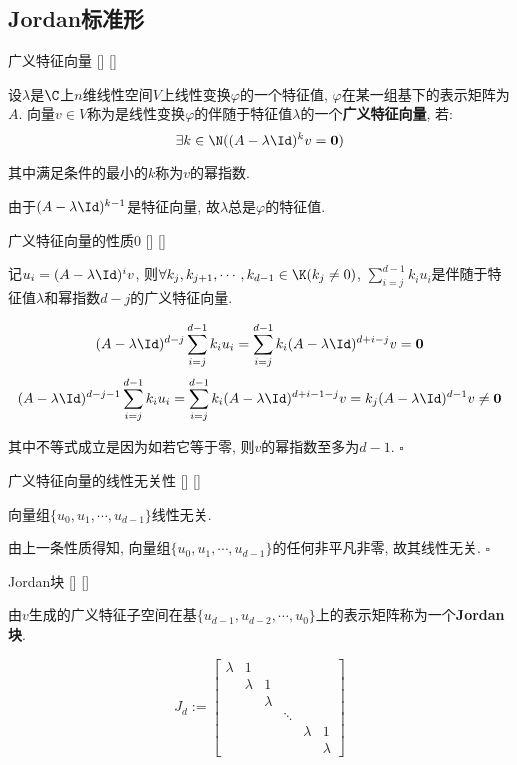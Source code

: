 \documentclass[UTF8]{ctexart}
\begin{document}
	\subsection{Jordan标准形}
	
		\begin{dfn}
			[]
			{广义特征向量}
			[]
			[]

			设$\lambda$是$\C$上$n$维线性空间$V$上线性变换$\varphi$的一个特征值, $\varphi$在某一组基下的表示矩阵为$A$. 向量$v\in V$称为是线性变换$\varphi$的伴随于特征值$\lambda$的一个\textbf{广义特征向量}, 若: 
			\[\exists k\in\N((A-\lambda\Id)^k v=\mathbf{0})\]

			其中满足条件的最小的$k$称为$v$的幂指数. 

			由于$(A-\lambda\Id)^{k-1}$是特征向量, 故$\lambda$总是$\varphi$的特征值. 
		\end{dfn}
		
		\begin{ppt}
			[]
			{广义特征向量的性质0}
			[]
			[]

			记$u_i=(A-\lambda\Id)^i v$, 则$\forall k_j,k_{j+1},\cdots,k_{d-1}\in\K(k_j\neq 0)$, $\sum\limits_{i=j}^{d-1}k_i u_i$是伴随于特征值$\lambda$和幂指数$d-j$的广义特征向量. 
		\end{ppt}

		\begin{prf} 
			\[(A-\lambda\Id)^{d-j}\sum_{i=j}^{d-1}k_i u_i=\sum_{i=j}^{d-1}k_i (A-\lambda\Id)^{d+i-j} v=\mathbf{0}\]
			\[(A-\lambda\Id)^{d-j-1}\sum_{i=j}^{d-1}k_i u_i=\sum_{i=j}^{d-1}k_i (A-\lambda\Id)^{d+i-1-j} v=k_j(A-\lambda\Id)^{d-1} v\neq\mathbf{0}\]

			其中不等式成立是因为如若它等于零, 则$v$的幂指数至多为$d-1$. $\square$
		\end{prf}
		\begin{ppt}
			[]
			{广义特征向量的线性无关性}
			[]
			[]

			向量组$\{u_0,u_1,\cdots,u_{d-1}\}$线性无关. 
		\end{ppt}

		\begin{prf} 
		
			由上一条性质得知, 向量组$\{u_0,u_1,\cdots,u_{d-1}\}$的任何非平凡 非零, 故其线性无关. $\square$
		\end{prf}
		\begin{dfn}
			[]
			{Jordan块}
			[]
			[]

			由$v$生成的广义特征子空间在基$\{u_{d-1},u_{d-2},\cdots,u_0\}$上的表示矩阵称为一个\textbf{Jordan块}. 
		
			\[J_d:=
			\begin{bmatrix}
				\lambda & 1\\
				 & \lambda & 1\\
				 & & \lambda\\ 
				 & & & \ddots\\
				 & & & & \lambda & 1\\
				 & & & & & \lambda
			\end{bmatrix}\]
		\end{dfn}
\end{document}
